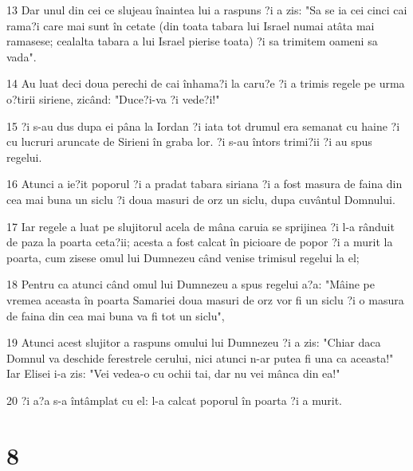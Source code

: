 \par 13 Dar unul din cei ce slujeau înaintea lui a raspuns ?i a zis: "Sa se ia cei cinci cai rama?i care mai sunt în cetate (din toata tabara lui Israel numai atâta mai ramasese; cealalta tabara a lui Israel pierise toata) ?i sa trimitem oameni sa vada".
\par 14 Au luat deci doua perechi de cai înhama?i la caru?e ?i a trimis regele pe urma o?tirii siriene, zicând: "Duce?i-va ?i vede?i!"
\par 15 ?i s-au dus dupa ei pâna la Iordan ?i iata tot drumul era semanat cu haine ?i cu lucruri aruncate de Sirieni în graba lor. ?i s-au întors trimi?ii ?i au spus regelui.
\par 16 Atunci a ie?it poporul ?i a pradat tabara siriana ?i a fost masura de faina din cea mai buna un siclu ?i doua masuri de orz un siclu, dupa cuvântul Domnului.
\par 17 Iar regele a luat pe slujitorul acela de mâna caruia se sprijinea ?i l-a rânduit de paza la poarta ceta?ii; acesta a fost calcat în picioare de popor ?i a murit la poarta, cum zisese omul lui Dumnezeu când venise trimisul regelui la el;
\par 18 Pentru ca atunci când omul lui Dumnezeu a spus regelui a?a: "Mâine pe vremea aceasta în poarta Samariei doua masuri de orz vor fi un siclu ?i o masura de faina din cea mai buna va fi tot un siclu",
\par 19 Atunci acest slujitor a raspuns omului lui Dumnezeu ?i a zis: "Chiar daca Domnul va deschide ferestrele cerului, nici atunci n-ar putea fi una ca aceasta!" Iar Elisei i-a zis: "Vei vedea-o cu ochii tai, dar nu vei mânca din ea!"
\par 20 ?i a?a s-a întâmplat cu el: l-a calcat poporul în poarta ?i a murit.

\chapter{8}


